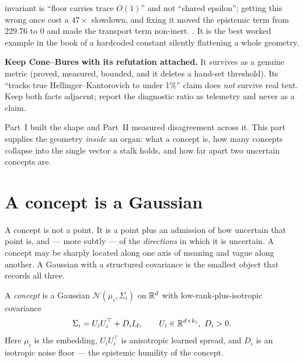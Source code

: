 \begin{workplan}{\Keep}
{    invariant is ``floor carries trace $O(1)$'' and not ``shared epsilon'';
    getting this wrong once cost a $47\times$ slowdown, and fixing it moved the
    epistemic term from $229.76$ to $0$ and made the transport term non-inert.
    \Measured. It is the best worked example in the book of a hardcoded
    constant silently flattening a whole geometry.
  \item \textbf{Keep Cone--Bures with its refutation attached.} It survives as
    a genuine metric (proved, measured, bounded, and it deletes a hand-set
    threshold). Its ``tracks true Hellinger--Kantorovich to under 1\%'' claim
    does \emph{not} survive real text. Keep both facts adjacent; report the
    diagnostic ratio as telemetry and never as a claim.
}

\end{workplan}

Part~I built the shape and Part~II measured disagreement across it. This
part supplies the geometry \emph{inside} an organ: what a concept is,
how many concepts collapse into the single vector a stalk holds, and how
far apart two uncertain concepts are.

\section{A concept is a Gaussian}

\begin{intu}\Intu
A concept is not a point. It is a point plus an admission of how
uncertain that point is, and --- more subtly --- of the \emph{directions}
in which it is uncertain. A concept may be sharply located along one
axis of meaning and vague along another. A Gaussian with a structured
covariance is the smallest object that records all three.
\end{intu}

\begin{definition}[Concept]\label{def:concept-gauss}
A \emph{concept} is a Gaussian $\mathcal N(\mu_i,\Sigma_i)$ on $\mathbb{R}^{d}$
with low-rank-plus-isotropic covariance
\begin{equation}\label{eq:cov}
  \Sigma_i=U_iU_i^\top+D_i I_d,
  \qquad U_i\in\mathbb{R}^{d\times k_i},\ D_i>0 .
\end{equation}
Here $\mu_i$ is the embedding, $U_iU_i^\top$ is anisotropic learned
spread, and $D_i$ is an isotropic noise floor --- the epistemic humility
of the concept.
\end{definition}

